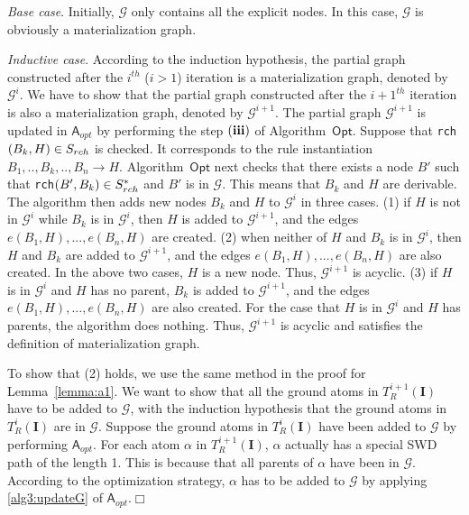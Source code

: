 \documentclass[final,1p,times]{elsarticle}
\begin{document}
\emph{Base case}. Initially, $\mathcal{G}$ only contains all the explicit nodes.
In this case, $\mathcal{G}$ is obviously a materialization graph.

\emph{Inductive case}.
According to the induction hypothesis, the partial graph constructed after
the $i^{th}$ ($i>1$) iteration is a materialization graph, denoted by $\mathcal{G}^{i}$.
We have to show that the partial graph constructed after the $i+1^{th}$ iteration is
also a materialization graph, denoted by $\mathcal{G}^{i+1}$.
The partial graph $\mathcal{G}^{i+1}$ is updated in $\mathsf{A}_{opt}$ by performing the step $(\textbf{\romannumeral3})$
of Algorithm~$\mathsf{Opt}$.
Suppose that \texttt{rch}$(B_k,H)\in S_{\tiny rch}$ is checked.
It corresponds to the rule instantiation $B_1,..,B_k,..,B_n\rightarrow H$.
Algorithm~$\mathsf{Opt}$ next checks that there exists a node $B'$ such that
\texttt{rch}$(B',B_k)\in S^*_{\tiny rch}$
and $B'$ is in $\mathcal{G}$. This means that $B_k$ and $H$ are derivable.
The algorithm then adds new nodes $B_k$ and $H$ to $\mathcal{G}^{i}$ in three cases.
(1) if $H$ is not in $\mathcal{G}^{i}$ while $B_k$ is in $\mathcal{G}^{i}$,
then $H$ is added to $\mathcal{G}^{i+1}$, and the edges $e(B_1, H),...,e(B_n, H)$ are created.
(2) when neither of $H$ and $B_k$ is in $\mathcal{G}^{i}$,
then $H$ and $B_k$ are added to $\mathcal{G}^{i+1}$, and the edges $e(B_1, H),...,e(B_n, H)$ are also created.
In the above two cases, $H$ is a new node. Thus,
$\mathcal{G}^{i+1}$ is acyclic.
(3) if $H$ is in $\mathcal{G}^{i}$ and $H$ has no parent,
$B_k$ is added to $\mathcal{G}^{i+1}$, and the edges $e(B_1, H),...,e(B_n, H)$ are also created.
For the case that $H$ is in $\mathcal{G}^{i}$ and $H$ has parents,
the algorithm does nothing.
Thus, $\mathcal{G}^{i+1}$ is acyclic and satisfies the definition of materialization graph.

To show that (2) holds, we use the same method in the proof for Lemma~\ref{lemma:a1}.
We want to show that all the ground atoms in $T_R^{i+1}(\textbf{I})$ have to be added to $\mathcal{G}$,
with the induction hypothesis that the ground atoms in $T_R^{i}(\textbf{I})$ are in $\mathcal{G}$.
Suppose the ground atoms in $T_R^{i}(\textbf{I})$ have been added to $\mathcal{G}$ by
performing $\mathsf{A}_{opt}$.
For each atom $\alpha$ in $T_R^{i+1}(\textbf{I})$, $\alpha$ actually has a special SWD path
of the length 1. This is because that all parents of $\alpha$ have been in $\mathcal{G}$.
According to the optimization strategy, $\alpha$ has to be added to $\mathcal{G}$ by applying \ref{alg3:updateG}
of $\mathsf{A}_{opt}$.\hfill$\Box$
\end{document}
